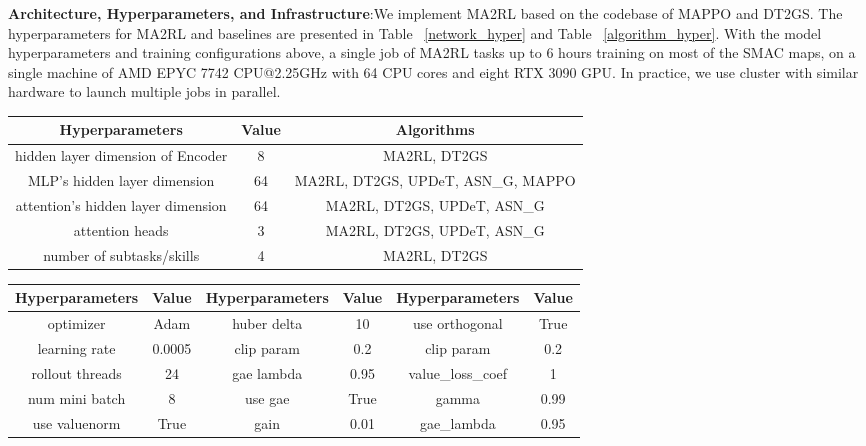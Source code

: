 \textbf{Architecture, Hyperparameters, and Infrastructure}:We implement MA2RL based on the codebase of MAPPO and DT2GS. The hyperparameters for MA2RL and baselines are presented in Table ~\ref{network_hyper} and Table ~\ref{algorithm_hyper}. With the model hyperparameters and training configurations above, a single job of MA2RL tasks up to 6 hours training on most of the SMAC maps, on a single machine of AMD EPYC 7742 CPU@2.25GHz with 64 CPU cores and eight RTX 3090 GPU. In practice, we use cluster with similar hardware to launch multiple jobs in parallel.
\begin{table*}[!ht]
    \centering
    \caption{Network hyperparameters used for MA2RL and baselines}
    \begin{tabular}{ccc}
    \hline
        \textbf{Hyperparameters} & \textbf{Value} & \textbf{Algorithms} \\ \hline
        hidden layer dimension of Encoder & 8 & MA2RL, DT2GS \\ 
        MLP's hidden layer dimension  & 64 & MA2RL, DT2GS, UPDeT, ASN\_G, MAPPO \\ 
        attention's hidden layer dimension & 64 & MA2RL, DT2GS, UPDeT, ASN\_G \\ 
        attention heads & 3 & MA2RL, DT2GS, UPDeT, ASN\_G \\ 
        number of subtasks/skills & 4 & MA2RL, DT2GS \\ \hline
    \end{tabular}
    \label{network_hyper}
\end{table*}

\begin{table*}[!ht]
    \centering
    \caption{Algorithm hyperparameters used for MA2RL and baselines}
    \begin{tabular}{cccccc}
    \hline
        \textbf{Hyperparameters} & \textbf{Value} & \textbf{Hyperparameters} & \textbf{Value} & \textbf{Hyperparameters} & \textbf{Value} \\ \hline
        optimizer & Adam & huber delta & 10 & use orthogonal & True \\ 
        learning rate & 0.0005 & clip param & 0.2 & clip param & 0.2 \\ 
        rollout threads & 24 & gae lambda & 0.95 & value\_loss\_coef & 1 \\ 
        num mini batch & 8 & use gae & True & gamma & 0.99 \\ 
        use valuenorm & True & gain & 0.01 & gae\_lambda & 0.95 \\ \hline
    \end{tabular}
    \label{algorithm_hyper}
\end{table*}




